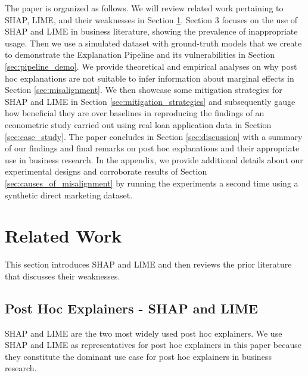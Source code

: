 \documentclass[mnsc,blindrev]{informs3}
\begin{document}
    The paper is organized as follows. We will review related work pertaining to SHAP, LIME, and their weaknesses in Section \ref{sec:related_work}. Section 3 focuses on the use of SHAP and LIME in business literature, showing the prevalence of inappropriate usage. Then we use a simulated dataset with ground-truth models that we create to demonstrate the Explanation Pipeline and its vulnerabilities in Section \ref{sec:pipeline_demo}.  We provide theoretical and empirical analyses on why post hoc explanations are not suitable to infer information about marginal effects in Section \ref{sec:misalignment}. %
    We then showcase some mitigation strategies for SHAP and LIME in Section \ref{sec:mitigation_strategies} and subsequently gauge how beneficial they are over baselines in reproducing the findings of an econometric study carried out using real loan application data in Section \ref{sec:case_study}. The paper concludes in Section \ref{sec:discussion} with a summary of our findings and final remarks on post hoc explanations and their appropriate use in business research. In the appendix, we provide additional details about our experimental designs and  corroborate results of Section \ref{sec:causes_of_misalignment} by running the experiments a second time using a synthetic direct marketing dataset.
    
  \section{Related Work}
    \label{sec:related_work}
    This section introduces SHAP and LIME and then reviews the prior literature that discusses their weaknesses. %

    \subsection{Post Hoc Explainers - SHAP and LIME}
     SHAP \citep{lundberg17shap} and LIME \citep{ribeiro16lime}  are the two most widely used post hoc explainers. %
        We use SHAP and LIME as representatives for post hoc explainers in this paper because they constitute the dominant use case for post hoc explainers in business research.
\end{document}
